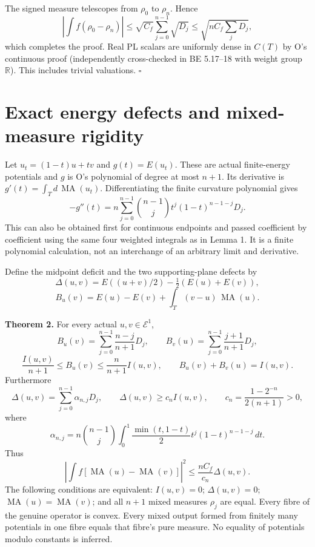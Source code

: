 \documentclass[
  11pt,
]{article}
\begin{document}
The signed measure telescopes from \(\rho_0\) to \(\rho_n\). Hence \[
 \left|\int f(\rho_0-\rho_n)\right|
 \leq\sqrt{C_f}\sum_{j=0}^{n-1}\sqrt{D_j}
 \leq\sqrt{nC_f\sum_jD_j},
\] which completes the proof. Real PL scalars are uniformly dense in
\(C(T)\) by O's continuous proof (independently cross-checked in BE
5.17--18 with weight group \(\mathbb R\)). This includes trivial
valuations. \(\square\)

\section{Exact energy defects and mixed-measure
rigidity}\label{exact-energy-defects-and-mixed-measure-rigidity}

Let \(u_t=(1-t)u+tv\) and \(g(t)=E(u_t)\). These are actual
finite-energy potentials and \(g\) is O's polynomial of degree at most
\(n+1\). Its derivative is \(g'(t)=\int_Td\,\operatorname{MA}(u_t)\).
Differentiating the finite curvature polynomial gives \[
 -g''(t)=n\sum_{j=0}^{n-1}\binom{n-1}{j}
                 t^j(1-t)^{n-1-j}D_j.                         \tag{5}
\] This can also be obtained first for continuous endpoints and passed
coefficient by coefficient using the same four weighted integrals as in
Lemma 1. It is a finite polynomial calculation, not an interchange of an
arbitrary limit and derivative.

Define the midpoint deficit and the two supporting-plane defects by \[
 \Delta(u,v)=E((u+v)/2)-\tfrac12(E(u)+E(v)),
\] \[
 B_u(v)=E(u)-E(v)+\int_T(v-u)\,\operatorname{MA}(u).
\]

\textbf{Theorem 2.} For every actual \(u,v\in\mathcal E^1\), \[
 B_u(v)=\sum_{j=0}^{n-1}\frac{n-j}{n+1}D_j,
 \qquad B_v(u)=\sum_{j=0}^{n-1}\frac{j+1}{n+1}D_j,              \tag{6}
\] \[
 \frac{I(u,v)}{n+1}\leq B_u(v)\leq\frac{n}{n+1}I(u,v),
 \qquad B_u(v)+B_v(u)=I(u,v).                                  \tag{7}
\] Furthermore \[
 \Delta(u,v)=\sum_{j=0}^{n-1}\alpha_{n,j}D_j,
 \qquad \Delta(u,v)\geq c_n I(u,v),
 \qquad c_n=\frac{1-2^{-n}}{2(n+1)}>0,                         \tag{8}
\] where \[
 \alpha_{n,j}=n\binom{n-1}{j}\int_0^1
               \frac{\min(t,1-t)}2t^j(1-t)^{n-1-j}\,dt.
\] Thus \[
 \left|\int f[\operatorname{MA}(u)-\operatorname{MA}(v)]\right|^2
           \leq\frac{nC_f}{c_n}\Delta(u,v).                    \tag{9}
\] The following conditions are equivalent: \(I(u,v)=0\);
\(\Delta(u,v)=0\); \(\operatorname{MA}(u)=\operatorname{MA}(v)\); and
all \(n+1\) mixed measures \(\rho_j\) are equal. Every fibre of the
genuine operator is convex. Every mixed output formed from finitely many
potentials in one fibre equals that fibre's pure measure. No equality of
potentials modulo constants is inferred.
\end{document}
